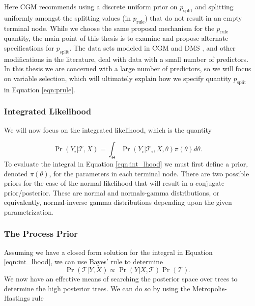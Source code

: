 Here CGM recommends using a discrete uniform prior on $p_{\text{split}}$ and splitting uniformly amongst the splitting values (in $p_{\text{rule}}$) that do not result in an empty terminal node. While we choose the same proposal mechanism for the $p_{\text{rule}}$ quantity, the main point of this thesis is to examine and propose alternate specifications for $p_{\text{split}}$. The data sets modeled in CGM \cite{chipman1998bayesian} and DMS \cite{denison1998bayesian}, and other modifications in the literature, deal with data with a small number of predictors. In this thesis we are concerned with a large number of predictors, so we will focus on variable selection, which will ultimately explain how we specify quantity $p_{\text{split}}$ in Equation \ref{eqn:prule}. 

\subsubsection{Integrated Likelihood}
We will now focus on the integrated likelihood, which is the quantity 

\begin{equation}\label{eqn:int_lhood}
\Pr(Y_i \vert \mathcal{T}, X) = \int_{\Theta}\Pr(Y_i \vert \mathcal{T}_i, X, \theta)\pi(\theta)d\theta.
\end{equation}
To evaluate the integral in Equation \ref{eqn:int_lhood} we must first define a prior, denoted $\pi(\theta)$, for the parameters in each terminal node. 
There are two possible priors for the case of the normal likelihood that will result in a conjugate prior/posterior. These are normal and normals-gamma distributions, or equivalently, normal-inverse gamma distributions depending upon the given parametrization. 

\subsubsection{The Process Prior}

Assuming we have a closed form solution for the integral in Equation \ref{eqn:int_lhood}, we can use Bayes' rule to determine 
\begin{equation}\label{eqn:tree_post}
\Pr(\mathcal{T} \vert Y , X) \propto \Pr(Y \vert X ,\mathcal{T})\Pr(\mathcal{T}).
\end{equation} 
We now have an effective means of searching the posterior space over trees to determine the high posterior trees. We can do so by using the Metropolis-Hastings rule 

